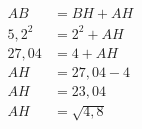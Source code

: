 $
\begin{aligned}
A B &= B H + A H\\
5,2 ^ { 2 } &= 2 ^ { 2 } + A H\\
27,04 &= 4 + A H\\
A H &= 27,04 - 4\\
A H &= 23,04\\
AH &= \sqrt { 4,8 }
\end{aligned}
$
